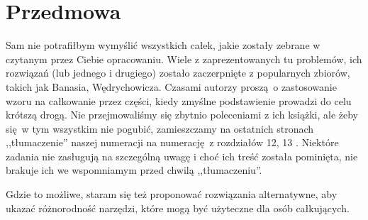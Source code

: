 

\tableofcontents

\chapter*{Przedmowa}
Sam nie potrafiłbym wymyślić wszystkich całek, jakie zostały zebrane w czytanym przez Ciebie opracowaniu.
Wiele z zaprezentowanych tu problemów, ich rozwiązań (lub jednego i drugiego) zostało zaczerpnięte z popularnych zbiorów, takich jak \cite{wedrychowicz12} Banasia, Wędrychowicza.
Czasami autorzy proszą o zastosowanie wzoru na całkowanie przez części, kiedy zmyślne podstawienie prowadzi do celu krótszą drogą.
Nie przejmowaliśmy się zbytnio poleceniami z ich książki, ale żeby się w tym wszystkim nie pogubić, zamieszczamy na ostatnich stronach ,,tłumaczenie'' naszej numeracji na numerację z rozdziałów 12, 13 \cite{wedrychowicz12}.
Niektóre zadania nie zasługują na szczególną uwagę i choć ich treść została pominięta, nie brakuje ich we wspomniamym przed chwilą ,,tłumaczeniu''.

Gdzie to możliwe, staram się też proponować rozwiązania alternatywne, aby ukazać różnorodność narzędzi, które mogą być użyteczne dla osób całkujących.



